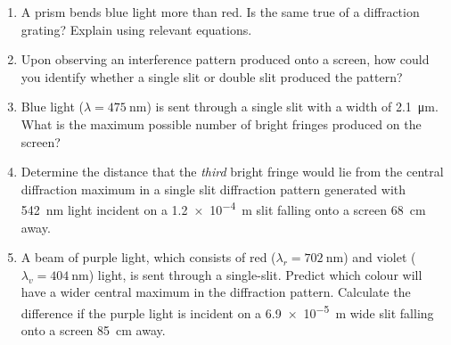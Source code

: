 \begin{multicols}{2}
\begin{enumerate}[itemsep=4pt,leftmargin=12pt]
%  
%  
%  

  \item A prism bends blue light more than red. Is the same true of a
    diffraction grating? Explain using relevant equations.
  
  \item Upon observing an interference pattern produced onto a screen, how
    could you identify whether a single slit or double slit produced the
    pattern?
    
  \item Blue light ($\lambda=\SI{475}{\nano\metre}$) is sent through a single
    slit with a width of \SI{2.1}{\micro\metre}. What is the maximum possible
    number of bright fringes produced on the screen?

  \item Determine the distance that the \emph{third} bright fringe would lie
    from the central diffraction maximum in a single slit diffraction pattern
    generated with \SI{542}{\nano\metre} light incident on a \SI{1.2e-4}{\metre}
    slit falling onto a screen \SI{68}{\centi\metre} away.

  \item A beam of purple light, which consists of red
    ($\lambda_r=\SI{702}{\nano\metre}$) and violet
    ($\lambda_v=\SI{404}{\nano\metre}$) light, is sent through a single-slit.
    Predict which colour will have a wider central maximum in the diffraction
    pattern. Calculate the difference if the purple light is incident on a
    \SI{6.9e-5}{\metre} wide slit falling onto a screen \SI{85}{\centi\metre}
    away.


\end{enumerate}
\end{multicols}
